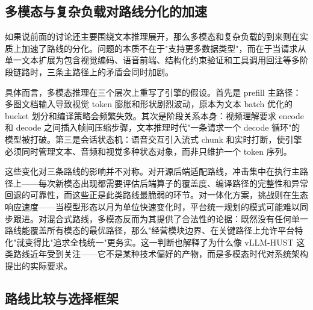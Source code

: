 \subsection{多模态与复杂负载对路线分化的加速}

如果说前面的讨论还主要围绕文本推理展开，那么多模态和复杂负载的到来则在实质上加速了路线的分化。问题的本质不在于"支持更多数据类型"，而在于当请求从单一文本扩展为包含视觉编码、语音前端、结构化约束验证和工具调用回注等多阶段链路时，三条主路径上的矛盾会同时加剧。

具体而言，多模态推理在三个层次上重写了引擎的假设。首先是 prefill 主路径：多图文档输入导致视觉 token 膨胀和形状剧烈波动，原本为文本 batch 优化的 bucket 划分和编译策略会频繁失效。其次是阶段关系本身：视频理解要求 encode 和 decode 之间插入帧间压缩步骤，文本推理时代"一条请求一个 decode 循环"的模型被打破。第三是会话状态机：语音交互引入流式 chunk 和实时打断，使引擎必须同时管理文本、音频和视觉多种状态对象，而非只维护一个 token 序列。

这些变化对三条路线的影响并不对称。对开源后端适配路线，冲击集中在执行主路径上——每次新模态出现都需要评估后端算子的覆盖度、编译路径的完整性和异常回退的可靠性，而这些正是此类路线最脆弱的环节。对一体化方案，挑战则在生态响应速度——当模型形态以月为单位快速变化时，平台统一规划的模式可能难以同步跟进。对混合式路线，多模态反而为其提供了合法性的论据：既然没有任何单一路线能覆盖所有模态的最优路径，那么"经营模块边界、在关键路径上允许平台特化"就变得比"追求全栈统一"更务实。这一判断也解释了为什么像 vLLM-HUST 这类路线近年受到关注——它不是某种技术偏好的产物，而是多模态时代对系统架构提出的实际要求。

\subsection{路线比较与选择框架}


